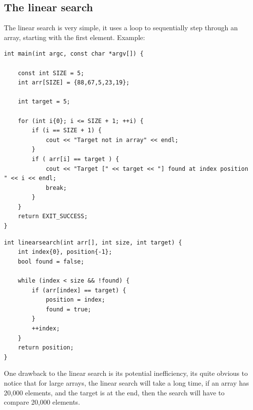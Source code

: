 \documentclass{report}
\begin{document}
    \subsection{The linear search}
    \bigbreak \noindent 
    The linear search is very simple, it uses a loop to sequentially step through an array, starting with the first element.
    \bigbreak \noindent 
    Example:
    \bigbreak \noindent 
    \sepline
    \begin{verbatim}
int main(int argc, const char *argv[]) {

    const int SIZE = 5;
    int arr[SIZE] = {88,67,5,23,19};

    int target = 5;

    for (int i{0}; i <= SIZE + 1; ++i) {
        if (i == SIZE + 1) {
            cout << "Target not in array" << endl;
        }
        if ( arr[i] == target ) {
            cout << "Target [" << target << "] found at index position " << i << endl;
            break;
        }
    }
    return EXIT_SUCCESS;
}
    \end{verbatim}
    \sepline
    \bigbreak \noindent 
    \sepline
    \begin{verbatim}
int linearsearch(int arr[], int size, int target) {
    int index{0}, position{-1};
    bool found = false;

    while (index < size && !found) {
        if (arr[index] == target) {
            position = index;
            found = true;
        }
        ++index;
    }
    return position;
}
    \end{verbatim}
    \sepline
    \bigbreak \noindent 
    \pagebreak \bigbreak \noindent 
    One drawback to the linear search is its potential inefficiency, its quite obvious to notice that for large arrays, the linear search will take a long time, if an array has 20,000 elements, and the target is at the end, then the search will have to compare 20,000 elements.
    \bigbreak \noindent 
\end{document}
